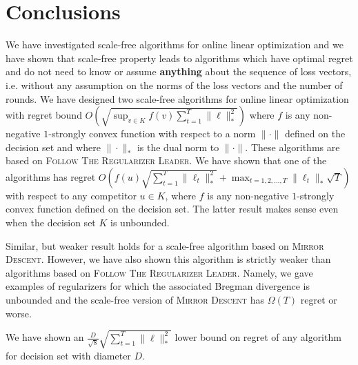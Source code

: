 \section{Conclusions}
\label{section:conclusions}

We have investigated scale-free algorithms for online linear optimization and
we have shown that scale-free property leads to algorithms which have optimal
regret and do not need to know or assume \textbf{anything} about the sequence
of loss vectors, i.e. without any assumption on the norms of the loss vectors
and the number of rounds. We have designed two scale-free algorithms for online
linear optimization with regret bound $O \left(\sqrt{\sup_{v \in K} f(v)
\sum_{t=1}^T \|\ell\|_*^2} \right)$ where $f$ is any non-negative $1$-strongly
convex function with respect to a norm $\|\cdot\|$ defined on the decision set
and where $\|\cdot\|_*$ is the dual norm to $\|\cdot\|$.  These algorithms are
based on \textsc{Follow The Regularizer Leader}.  We have shown that one of the
algorithms has regret $O \left(f(u) \sqrt{\sum_{t=1}^T \|\ell_t\|_*^2} +
\max_{t=1,2,\dots,T} \|\ell_t\|_* \sqrt{T} \right)$ with respect to any
competitor $u \in K$, where $f$ is any non-negative $1$-strongly convex
function defined on the decision set.  The latter result makes sense even when
the decision set $K$ is unbounded.

Similar, but weaker result holds for a scale-free algorithm based on
\textsc{Mirror Descent}. However, we have also shown this algorithm is strictly
weaker than algorithms based on \textsc{Follow The Regularizer Leader}. Namely,
we gave examples of regularizers for which the associated Bregman divergence is
unbounded and the scale-free version of \textsc{Mirror Descent} has $\Omega(T)$
regret or worse.

We have shown an $\frac{D}{\sqrt{8}} \sqrt{\sum_{t=1}^T \|\ell\|_*^2}$
lower bound on regret of any algorithm for decision set with diameter $D$.
